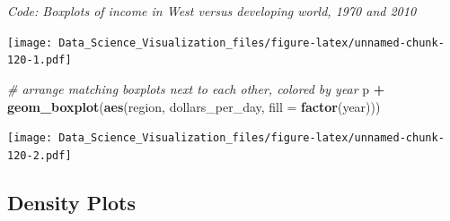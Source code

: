 \documentclass[
]{article}
\newenvironment{Shaded}{\begin{snugshade}}{\end{snugshade}}
\newcommand{\CommentTok}[1]{\textcolor[rgb]{0.56,0.35,0.01}{\textit{#1}}}
\newcommand{\DataTypeTok}[1]{\textcolor[rgb]{0.13,0.29,0.53}{#1}}
\newcommand{\DecValTok}[1]{\textcolor[rgb]{0.00,0.00,0.81}{#1}}
\newcommand{\KeywordTok}[1]{\textcolor[rgb]{0.13,0.29,0.53}{\textbf{#1}}}
\newcommand{\NormalTok}[1]{#1}
\newcommand{\OperatorTok}[1]{\textcolor[rgb]{0.81,0.36,0.00}{\textbf{#1}}}
\newcommand{\StringTok}[1]{\textcolor[rgb]{0.31,0.60,0.02}{#1}}
\begin{document}
\emph{Code: Boxplots of income in West versus developing world, 1970 and
2010}

\begin{Shaded}
\end{Shaded}

\texttt{[image: Data\_Science\_Visualization\_files/figure-latex/unnamed-chunk-120-1.pdf]}

\begin{Shaded}
\begin{Highlighting}[]
\CommentTok{# arrange matching boxplots next to each other, colored by year}
\NormalTok{p }\OperatorTok{+}\StringTok{ }\KeywordTok{geom_boxplot}\NormalTok{(}\KeywordTok{aes}\NormalTok{(region, dollars_per_day, }\DataTypeTok{fill =} \KeywordTok{factor}\NormalTok{(year)))}
\end{Highlighting}
\end{Shaded}

\texttt{[image: Data\_Science\_Visualization\_files/figure-latex/unnamed-chunk-120-2.pdf]}

\hypertarget{density-plots}{%
\subsection{Density Plots}\label{density-plots}}
\end{document}
